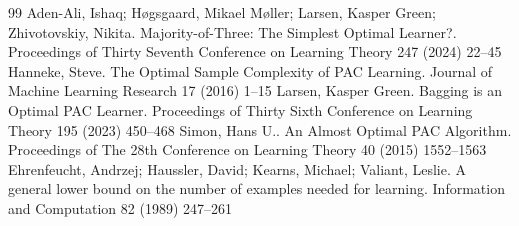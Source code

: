 \documentclass[10pt,a4paper]{amsart}
\newcommand{\1}{\mathbf 1}
\begin{document}
\begin{thebibliography}{99}
 Aden-Ali, Ishaq; H{\o}gsgaard, Mikael M{\o}ller; Larsen, Kasper Green; Zhivotovskiy, Nikita. Majority-of-Three: The Simplest Optimal Learner?. Proceedings of Thirty Seventh Conference on Learning Theory 247 (2024) 22--45
 Hanneke, Steve. The Optimal Sample Complexity of {PAC} Learning. Journal of Machine Learning Research 17 (2016) 1--15
 Larsen, Kasper Green. Bagging is an Optimal {PAC} Learner. Proceedings of Thirty Sixth Conference on Learning Theory 195 (2023) 450--468
 Simon, Hans U.. An Almost Optimal {PAC} Algorithm. Proceedings of The 28th Conference on Learning Theory 40 (2015) 1552--1563
 Ehrenfeucht, Andrzej; Haussler, David; Kearns, Michael; Valiant, Leslie. A general lower bound on the number of examples needed for learning. Information and Computation 82 (1989) 247--261
\end{thebibliography}
\end{document}
